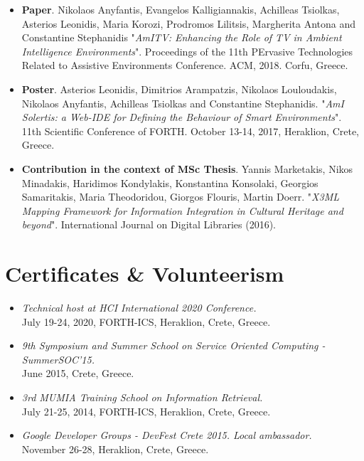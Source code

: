 \documentclass[11pt]{article}
\begin{document}
\begin{itemize}

\item 
\textbf{Paper}. 
Nikolaos Anyfantis, Evangelos Kalligiannakis, Achilleas Tsiolkas, Asterios Leonidis, Maria Korozi, Prodromos Lilitsis, Margherita Antona and Constantine Stephanidis "\textit{AmITV: Enhancing the Role of TV in Ambient Intelligence Environments}". Proceedings of the 11th PErvasive Technologies Related to Assistive Environments Conference. ACM, 2018. Corfu, Greece.

\item 
\textbf{Poster}.
Asterios Leonidis, Dimitrios Arampatzis, Nikolaos Louloudakis, Nikolaos Anyfantis, Achilleas Tsiolkas and Constantine Stephanidis. "\textit{AmI Solertis: a Web-IDE for Defining the Behaviour of Smart Environments}". 11th Scientific Conference of FORTH. October 13-14, 2017, Heraklion, Crete, Greece.

\item 
\textbf{Contribution in the context of MSc Thesis}. 
Yannis Marketakis, Nikos Minadakis, Haridimos Kondylakis, Konstantina Konsolaki, Georgios Samaritakis, Maria Theodoridou, Giorgos Flouris, Martin Doerr. "\textit{X3ML Mapping Framework for Information Integration in Cultural Heritage and beyond}". International Journal on Digital Libraries (2016).

\end{itemize}

\section{Certificates \& Volunteerism}

\begin{itemize}

\item
\textit{Technical host at HCI International 2020 Conference.} \\
July 19-24, 2020, FORTH-ICS, Heraklion, Crete, Greece.

\item
\textit{9th Symposium and Summer School on Service Oriented Computing - SummerSOC'15.} \\
June 2015, Crete, Greece.

\item
\textit{3rd MUMIA Training School on Information Retrieval.} \\
July 21-25, 2014, FORTH-ICS, Heraklion, Crete, Greece.

\item
\textit{Google Developer Groups - DevFest Crete 2015. Local ambassador.} \\
November 26-28, Heraklion, Crete, Greece.

\end{itemize}
\end{document}
